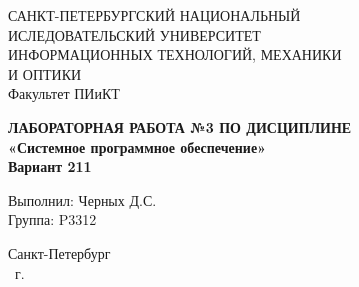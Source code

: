 \documentclass[14pt,a4paper,report]{ncc}
\begin{document}
\renewcommand{\thesection}{\arabic{section}}

\renewcommand{\chaptername}{}
\def\contentsname{Содержание}

\begin{titlepage}
\begin{center}
\large{САНКТ-ПЕТЕРБУРГСКИЙ НАЦИОНАЛЬНЫЙ\\
ИСЛЕДОВАТЕЛЬСКИЙ УНИВЕРСИТЕТ\\
ИНФОРМАЦИОННЫХ ТЕХНОЛОГИЙ, МЕХАНИКИ\\
И ОПТИКИ\\[5mm]
Факультет ПИиКТ\\[2mm]}

\vfill

\textbf{ЛАБОРАТОРНАЯ РАБОТА №3 ПО ДИСЦИПЛИНЕ\\[3mm]
«Системное программное обеспечение»\\[6mm]
Вариант 211
\\[20mm]
}
\end{center}

\hfill
\begin{minipage}{.5\textwidth}
Выполнил: Черных Д.С.\\
Группа: P3312\\[5mm]
\end{minipage}%
\vfill
\begin{center}
 Санкт-Петербург\\\theyear\ г.
\end{center}
\end{titlepage}
\thispagestyle{empty}
\tableofcontents
\thispagestyle{empty}
\newpage










\end{document}
